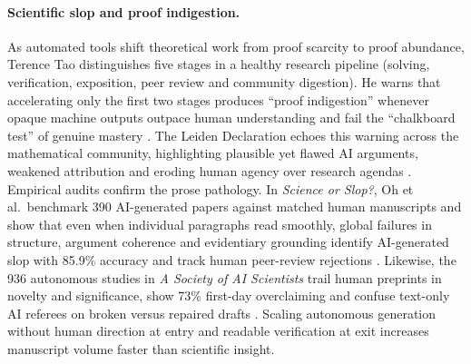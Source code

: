 \documentclass[11pt,a4paper]{article}
\begin{document}
\paragraph{Scientific slop and proof indigestion.}
As automated tools shift theoretical work from proof scarcity to proof
abundance, Terence Tao distinguishes five stages in a healthy research pipeline
(solving, verification, exposition, peer review and community digestion). He
warns that accelerating only the first two stages produces ``proof
indigestion'' whenever opaque machine outputs outpace human understanding and
fail the ``chalkboard test'' of genuine mastery \citep{tao2026age}. The Leiden
Declaration echoes this warning across the mathematical community, highlighting
plausible yet flawed AI arguments, weakened attribution and eroding human
agency over research agendas \citep{leiden2026}. Empirical audits confirm the
prose pathology. In \emph{Science or Slop?}, Oh et al.\ benchmark 390
AI-generated papers against matched human manuscripts and show that even when
individual paragraphs read smoothly, global failures in structure, argument
coherence and evidentiary grounding identify AI-generated slop with 85.9\%
accuracy and track human peer-review rejections \citep{oh2026slop}. Likewise,
the 936 autonomous studies in \emph{A Society of AI Scientists} trail human
preprints in novelty and significance, show 73\% first-day overclaiming and
confuse text-only AI referees on broken versus repaired drafts
\citep{societyai}. Scaling autonomous generation without human direction at
entry and readable verification at exit increases manuscript volume faster than
scientific insight.
\end{document}
